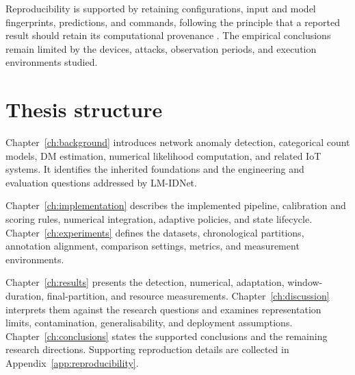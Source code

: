 Reproducibility is supported by retaining configurations, input and model
fingerprints, predictions, and commands, following the principle that a
reported result should retain its computational provenance
\cite{sandve2013}. The empirical conclusions remain limited by the devices,
attacks, observation periods, and execution environments studied.

\section{Thesis structure}

Chapter~\ref{ch:background} introduces network anomaly detection, categorical
count models, DM estimation, numerical likelihood computation, and related
IoT systems. It identifies the inherited foundations and the engineering
and evaluation questions addressed by LM-IDNet.

Chapter~\ref{ch:implementation} describes the implemented pipeline,
calibration and scoring rules, numerical integration, adaptive policies,
and state lifecycle. Chapter~\ref{ch:experiments} defines the datasets,
chronological partitions, annotation alignment, comparison settings,
metrics, and measurement environments.

Chapter~\ref{ch:results} presents the detection, numerical, adaptation,
window-duration, final-partition, and resource measurements.
Chapter~\ref{ch:discussion} interprets them against the research questions
and examines representation limits, contamination, generalisability, and
deployment assumptions. Chapter~\ref{ch:conclusions} states the supported
conclusions and the remaining research directions. Supporting reproduction
details are collected in Appendix~\ref{app:reproducibility}.
